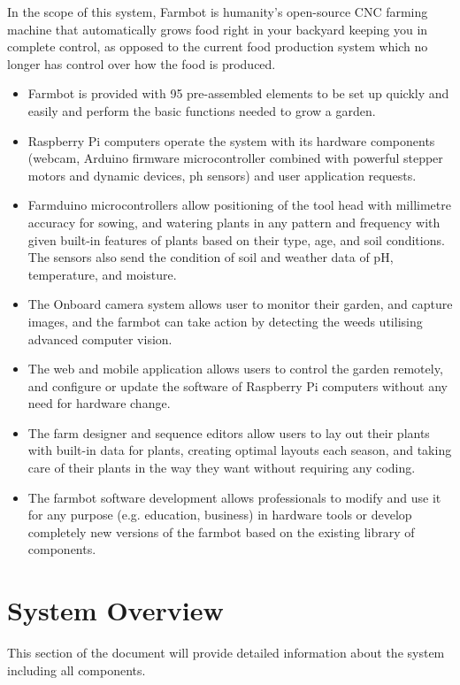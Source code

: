 In the scope of this system, Farmbot is humanity's open-source CNC farming machine that automatically grows food right in your backyard keeping you in complete control, as opposed to the current food production system which no longer has control over how the food is produced. 
\begin{itemize}
    \item Farmbot is provided with 95 pre-assembled elements to be set up quickly and easily and perform the basic functions needed to grow a garden.
    \item Raspberry Pi computers operate the system with its hardware components (webcam, Arduino firmware microcontroller combined with powerful stepper motors and dynamic devices, ph sensors) and user application requests.
    \item Farmduino microcontrollers allow positioning of the tool head with millimetre accuracy for sowing, and watering plants in any pattern and frequency with given built-in features of plants based on their type, age, and soil conditions. The sensors also send the condition of soil and weather data of pH, temperature, and moisture.
    \item The Onboard camera system allows user to monitor their garden, and capture images, and the farmbot can take action by detecting the weeds utilising advanced computer vision.
    \item The web and mobile application allows users to control the garden remotely, and configure or update the software of Raspberry Pi computers without any need for hardware change.
    \item The farm designer and sequence editors allow users to lay out their plants with built-in data for plants, creating optimal layouts each season, and taking care of their plants in the way they want without requiring any coding.
    \item The farmbot software development allows professionals to modify and use it for any purpose (e.g. education, business) in hardware tools or develop completely new versions of the farmbot based on the existing library of components.
    
\end{itemize}

\section{System Overview}
This section of the document will provide detailed information about the system including all components.

